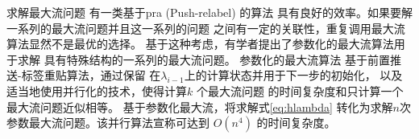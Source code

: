 %
%
%

求解最大流问题
有一类基于\gls{pra} (Push-relabel) 的算法\cite{Goldberg1988}
具有良好的效率。如果要解一系列的最大流问题并且这一系列的问题
之间有一定的关联性，重复调用最大流算法显然不是最优的选择。
基于这种考虑，有学者提出了参数化的最大流算法\cite{Gallo1989}用于求解
具有特殊结构的一系列的最大流问题。
%
%
参数化的最大流算法
基于前置推送-标签重贴算法，通过保留
在$\lambda_{i-1}$上的计算状态并用于下一步的初始化，
以及适当地使用并行化的技术，使得计算$k$ 个最大流问题
的时间复杂度和只计算一个最大流问题近似相等。
\citet{kolmogorov} 基于参数化最大流，将求解式\eqref{eq:hlambda}
转化为求解$n$次参数最大流问题。该并行算法宣称可达到 $O(n^4)$ 的时间复杂度。


